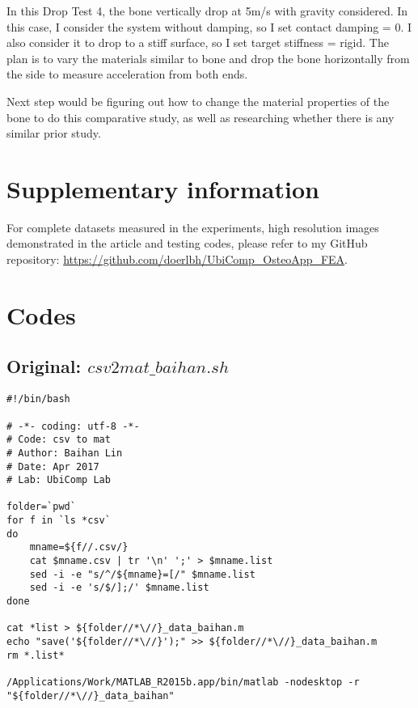 \documentclass{sigchi}
\begin{document}
In this Drop Test 4, the bone vertically drop at 5m/s with gravity considered. In this case, I consider the system without damping, so I set contact damping = 0. I also consider it to drop to a stiff surface, so I set target stiffness = rigid. The plan is to vary the materials similar to bone and drop the bone horizontally from the side to measure acceleration from both ends. 

Next step would be figuring out how to change the material properties of the bone to do this comparative study, as well as researching whether there is any similar prior study.

\section{Supplementary information}

For complete datasets measured in the experiments, high resolution images demonstrated in the article and testing codes, please refer to my GitHub repository: \url{https://github.com/doerlbh/UbiComp_OsteoApp_FEA}.

\section{Codes}

\subsection{Original: $csv2mat\_baihan.sh$}\label{ss:csv2mat}
\begin{lstlisting}
#!/bin/bash

# -*- coding: utf-8 -*-
# Code: csv to mat
# Author: Baihan Lin
# Date: Apr 2017
# Lab: UbiComp Lab

folder=`pwd`
for f in `ls *csv`
do
    mname=${f//.csv/}
    cat $mname.csv | tr '\n' ';' > $mname.list 
    sed -i -e "s/^/${mname}=[/" $mname.list
    sed -i -e 's/$/];/' $mname.list
done

cat *list > ${folder//*\//}_data_baihan.m
echo "save('${folder//*\//}');" >> ${folder//*\//}_data_baihan.m
rm *.list*

/Applications/Work/MATLAB_R2015b.app/bin/matlab -nodesktop -r "${folder//*\//}_data_baihan"
\end{lstlisting}
\end{document}
